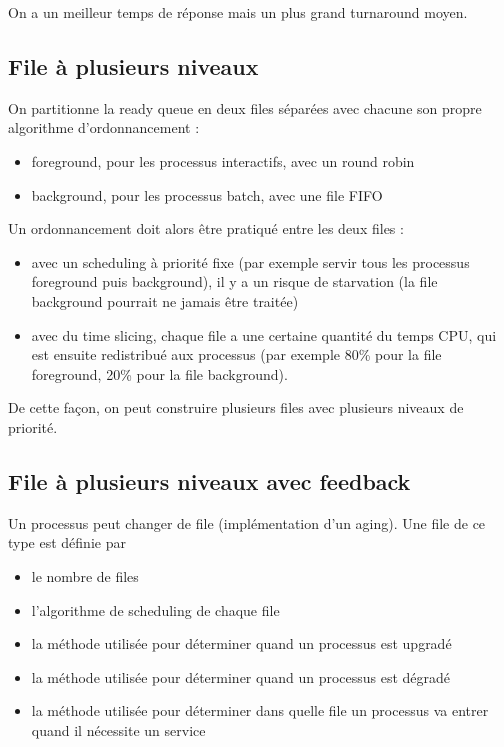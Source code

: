 On a un meilleur temps de réponse mais un plus grand turnaround moyen.

\subsection{File à plusieurs niveaux}

On partitionne  la ready queue en deux files séparées avec chacune son propre algorithme d'ordonnancement :

\begin{itemize}
	\item foreground, pour les processus interactifs, avec un round robin
	\item background, pour les processus batch, avec une file FIFO
\end{itemize}

Un ordonnancement doit alors être pratiqué entre les deux files :

\begin{itemize}
	\item avec un scheduling à priorité fixe (par exemple servir tous les processus foreground puis background), il y a un risque de starvation (la file background pourrait ne jamais être traitée)
	\item avec du time slicing, chaque file a une certaine quantité du temps CPU, qui est ensuite redistribué aux processus (par exemple 80\% pour la file foreground, 20\% pour la file background).
\end{itemize}

De cette façon, on peut construire plusieurs files avec plusieurs niveaux de priorité.

\subsection{File à plusieurs niveaux avec feedback}

Un processus peut changer de file (implémentation d'un aging). Une file de ce type est définie par

\begin{itemize}
	\item le nombre de files
	\item l'algorithme de scheduling de chaque file
	\item la méthode utilisée pour déterminer quand un processus est upgradé
	\item la méthode utilisée pour déterminer quand un processus est dégradé
	\item la méthode utilisée pour déterminer dans quelle file un processus va entrer quand il nécessite un service
\end{itemize}

